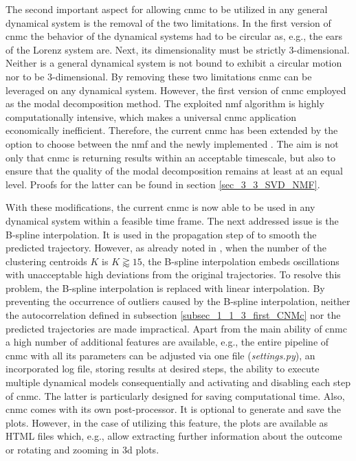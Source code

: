 The second important aspect for allowing \gls{cnmc} to be utilized in any general dynamical system is the removal of the two limitations.
In the first version of \gls{cnmc} the behavior of the dynamical systems had to be circular as, e.g., the ears of the Lorenz system \cite{lorenz1963deterministic} are.
Next, its dimensionality must be strictly 3-dimensional.
Neither is a general dynamical system is not bound to exhibit a circular motion nor to be 3-dimensional.
By removing these two limitations \gls{cnmc} can be leveraged on any dynamical system.
However, the first version of \gls{cnmc} employed  as the modal decomposition method. 
The exploited \gls{nmf} algorithm is highly computationally intensive, which makes a universal \gls{cnmc} application economically inefficient.
Therefore, the current \gls{cnmc} has been extended by the option to choose between the \gls{nmf} and the newly implemented .
The aim is not only that \gls{cnmc} is returning results within an acceptable timescale, but also to ensure that the quality of the modal decomposition remains at least at an equal level.
Proofs for the latter can be found in section \ref{sec_3_3_SVD_NMF}.\newline

With these modifications, the current \gls{cnmc} is now able to be used in any dynamical system within a feasible time frame.
The next addressed issue is the B-spline interpolation. 
It is used in the propagation step of  \cite{Fernex2021} to smooth the predicted trajectory. 
However, as already noted in \cite{Max2021}, when the number of the clustering centroids $K$ is $K \gtrapprox 15$, the B-spline interpolation embeds oscillations with unacceptable high deviations from the original trajectories.
To resolve this problem, the B-spline interpolation is replaced with linear interpolation. 
By preventing the occurrence of outliers caused by the B-spline interpolation, neither the autocorrelation defined in subsection \ref{subsec_1_1_3_first_CNMc} nor the predicted trajectories are made impractical.
Apart from the main ability of \gls{cnmc} a high number of additional features are available, e.g., the entire pipeline of \gls{cnmc} with all its parameters can be adjusted via one file (\emph{settings.py}), an incorporated log file, storing results at desired steps, the ability to execute multiple dynamical models consequentially and activating and disabling each step of \gls{cnmc}.
The latter is particularly designed for saving computational time.
Also, \gls{cnmc} comes with its own post-processor. 
It is optional to generate and save the plots. 
However, in the case of utilizing this feature, the plots are available as HTML files which, e.g., allow extracting further information about the outcome or rotating and zooming in 3d plots.